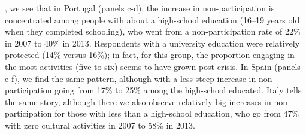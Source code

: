 , we see that in Portugal (panels c-d), the increase in non-participation is concentrated among people with about a high-school education (16–19 years old when they completed schooling), who went from a non-participation rate of 22\% in 2007 to 40\% in 2013. Respondents with a university education were relatively protected (14\% versus 16\%); in fact, for this group, the proportion engaging in the most activities (five to six) seems to have grown post-crisis. In Spain (panels e-f), we find the same pattern, although with a less steep increase in non-participation going from 17\% to 25\% among the high-school educated. Italy tells the same story, although there we also observe relatively big increases in non-participation for those with less than a high-school education, who go from 47\% with zero cultural activities in 2007 to 58\% in 2013. 

